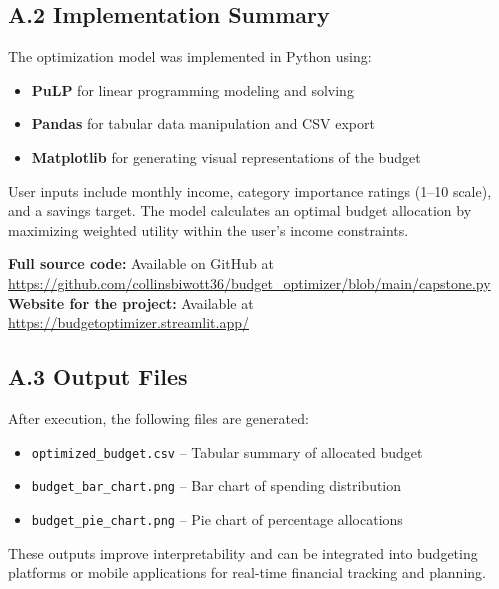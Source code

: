 \documentclass{article}
\begin{document}
\subsection*{A.2 Implementation Summary}

The optimization model was implemented in Python using:
\begin{itemize}
    \item \textbf{PuLP} for linear programming modeling and solving
    \item \textbf{Pandas} for tabular data manipulation and CSV export
    \item \textbf{Matplotlib} for generating visual representations of the budget
\end{itemize}

User inputs include monthly income, category importance ratings (1–10 scale), and a savings target. The model calculates an optimal budget allocation by maximizing weighted utility within the user’s income constraints.

\textbf{Full source code:} Available on GitHub at\\
\url{https://github.com/collinsbiwott36/budget_optimizer/blob/main/capstone.py}
\textbf{Website for the project:} Available at\\
\url{https://budgetoptimizer.streamlit.app/}

\subsection*{A.3 Output Files}

After execution, the following files are generated:
\begin{itemize}
    \item \texttt{optimized\_budget.csv} – Tabular summary of allocated budget
    \item \texttt{budget\_bar\_chart.png} – Bar chart of spending distribution
    \item \texttt{budget\_pie\_chart.png} – Pie chart of percentage allocations
\end{itemize}

These outputs improve interpretability and can be integrated into budgeting platforms or mobile applications for real-time financial tracking and planning.
\end{document}
